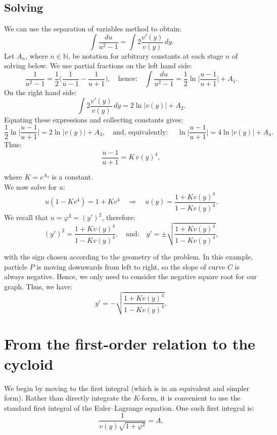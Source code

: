 \documentclass{article}
\begin{document}
\subsection{Solving}
We can use the separation of variables method to obtain:
\begin{equation}
   \int \frac{du}{u^2-1}=\int 2\frac{v'(y)}{v(y)}\,dy.
\end{equation}
Let $A_n$, where $n \in \mathbb{N}$, be notation for arbitrary constants at each stage $n$ of solving below. We use partial fractions on the left hand side:
\begin{equation}
    \frac{1}{u^2-1}=\frac{1}{2}\Big(\frac{1}{u-1}-\frac{1}{u+1}\Big), \quad \text{hence:} \quad \int\frac{du}{u^2-1}=\frac{1}{2}\ln\Big|\frac{u-1}{u+1}\Big| + A_1.
\end{equation}
On the right hand side:
\begin{equation}
    \int 2\frac{v'(y)}{v(y)}\,dy = 2\ln|v(y)| + A_2.  
\end{equation}
Equating these expressions and collecting constants gives:
\begin{equation}
    \frac{1}{2}\ln\Big|\frac{u-1}{u+1}\Big| = 2\ln|v(y)| + A_3, \quad \text{and, equivalently: } \quad \ln\Big|\frac{u-1}{u+1}\Big| = 4\ln|v(y)| + A_4.
\end{equation}
Thus:
\begin{equation}
    \frac{u-1}{u+1} = K\,v(y)^4,
\end{equation}

where \(K=e^{A_4}\) is a constant.
\\
We now solve for $u$:
\begin{equation}
    u(1-Kv^4)=1+Kv^4 \quad\Longrightarrow\quad
u(y)=\frac{1+K v(y)^4}{1-K v(y)^4}.
\end{equation}
We recall that \(u=\varphi^2=(y')^2\), therefore:
\begin{equation}
    (y')^2=\frac{1+K v(y)^4}{1-K v(y)^4}, \quad \text{and:} \quad y'=\pm\sqrt{\frac{1+K v(y)^4}{1-K v(y)^4}},
\end{equation}

with the sign chosen according to the geometry of the problem. In this example, particle $P$ is moving downwards from left to right, so the slope of curve $C$ is always negative. Hence, we only need to consider the negative square root for our graph. Thus, we have:
\begin{equation}
    y'=-\sqrt{\frac{1+K v(y)^4}{1-K v(y)^4}},
\end{equation}
\section{From the first-order relation to the cycloid}
We begin by moving to the first integral (which is in an equivalent and simpler form).
Rather than directly integrate the \(K\)-form, it is convenient to use the standard first integral of the Euler--Lagrange equation. One such first integral is:
\begin{equation}
 \frac{1}{v(y)\sqrt{1+\varphi^2}}=A,
\end{equation}
\end{document}
